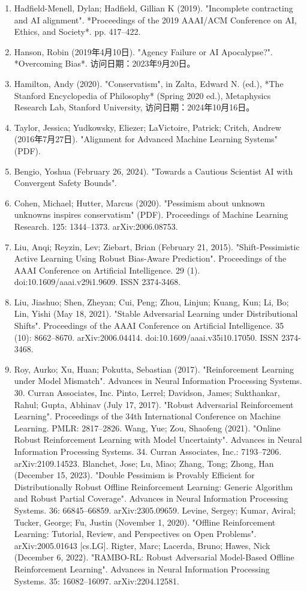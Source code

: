 \begin{enumerate}
\item Hadfield-Menell, Dylan; Hadfield, Gillian K (2019). "Incomplete contracting and AI alignment". *Proceedings of the 2019 AAAI/ACM Conference on AI, Ethics, and Society*. pp. 417–422.
\item Hanson, Robin (2019年4月10日). "Agency Failure or AI Apocalypse?". *Overcoming Bias*. 访问日期：2023年9月20日。
\item Hamilton, Andy (2020). "Conservatism", in Zalta, Edward N. (ed.), *The Stanford Encyclopedia of Philosophy* (Spring 2020 ed.), Metaphysics Research Lab, Stanford University, 访问日期：2024年10月16日。
\item Taylor, Jessica; Yudkowsky, Eliezer; LaVictoire, Patrick; Critch, Andrew (2016年7月27日). "Alignment for Advanced Machine Learning Systems" (PDF).
\item Bengio, Yoshua (February 26, 2024). "Towards a Cautious Scientist AI with Convergent Safety Bounds".
\item Cohen, Michael; Hutter, Marcus (2020). "Pessimism about unknown unknowns inspires conservatism" (PDF). Proceedings of Machine Learning Research. 125: 1344–1373. arXiv:2006.08753.
\item Liu, Anqi; Reyzin, Lev; Ziebart, Brian (February 21, 2015). "Shift-Pessimistic Active Learning Using Robust Bias-Aware Prediction". Proceedings of the AAAI Conference on Artificial Intelligence. 29 (1). doi:10.1609/aaai.v29i1.9609. ISSN 2374-3468.
\item Liu, Jiashuo; Shen, Zheyan; Cui, Peng; Zhou, Linjun; Kuang, Kun; Li, Bo; Lin, Yishi (May 18, 2021). "Stable Adversarial Learning under Distributional Shifts". Proceedings of the AAAI Conference on Artificial Intelligence. 35 (10): 8662–8670. arXiv:2006.04414. doi:10.1609/aaai.v35i10.17050. ISSN 2374-3468.
\item Roy, Aurko; Xu, Huan; Pokutta, Sebastian (2017). "Reinforcement Learning under Model Mismatch". Advances in Neural Information Processing Systems. 30. Curran Associates, Inc.
 Pinto, Lerrel; Davidson, James; Sukthankar, Rahul; Gupta, Abhinav (July 17, 2017). "Robust Adversarial Reinforcement Learning". Proceedings of the 34th International Conference on Machine Learning. PMLR: 2817–2826.
 Wang, Yue; Zou, Shaofeng (2021). "Online Robust Reinforcement Learning with Model Uncertainty". Advances in Neural Information Processing Systems. 34. Curran Associates, Inc.: 7193–7206. arXiv:2109.14523.
 Blanchet, Jose; Lu, Miao; Zhang, Tong; Zhong, Han (December 15, 2023). "Double Pessimism is Provably Efficient for Distributionally Robust Offline Reinforcement Learning: Generic Algorithm and Robust Partial Coverage". Advances in Neural Information Processing Systems. 36: 66845–66859. arXiv:2305.09659.
 Levine, Sergey; Kumar, Aviral; Tucker, George; Fu, Justin (November 1, 2020). "Offline Reinforcement Learning: Tutorial, Review, and Perspectives on Open Problems". arXiv:2005.01643 [cs.LG].
 Rigter, Marc; Lacerda, Bruno; Hawes, Nick (December 6, 2022). "RAMBO-RL: Robust Adversarial Model-Based Offline Reinforcement Learning". Advances in Neural Information Processing Systems. 35: 16082–16097. arXiv:2204.12581.
\end{enumerate}